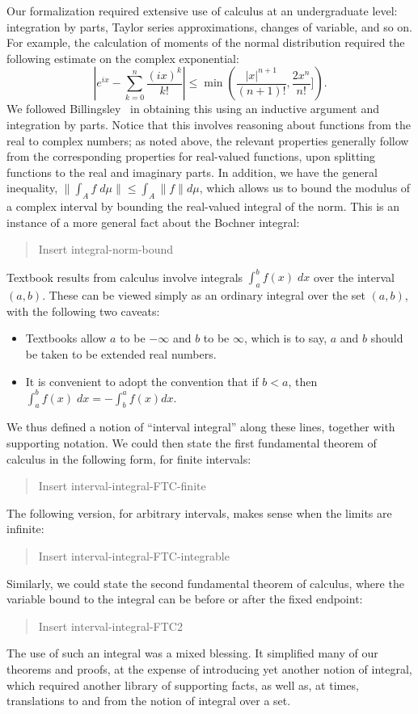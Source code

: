 \documentclass{svjour3}
\newcommand{\todo}[1]{{\color{red}#1}}
\begin{document}
Our formalization required extensive use of calculus at an undergraduate level: integration by parts, Taylor series approximations, changes of variable, and so on. For example, the calculation of moments of the normal distribution required the following estimate on the complex exponential:
\[
 \left| e^{ix} - \sum_{k=0}^n \frac{(ix)^k}{k!} \right| \le \min\left(\frac{|x|^{n+1}}{(n+1)!}, \frac{2 x^n}{n!}]\right).
\]
We followed Billingsley~\cite[Section 26]{billingsley:95} in obtaining this using an inductive argument and integration by parts. Notice that this involves reasoning about functions from the real to complex numbers; as noted above, the relevant properties generally follow from the corresponding properties for real-valued functions, upon splitting functions to the real and imaginary parts. In addition, we have the general inequality, $\| \int_A f \; d\mu \| \le \int_A \| f \| d\mu$, which allows us to bound the modulus of a complex interval by bounding the real-valued integral of the norm. This is an instance of a more general fact about the Bochner integral:
\begin{quote}
\todo{Insert integral-norm-bound}
\end{quote}

Textbook results from calculus involve integrals $\int_a^b f(x) \; dx$ over the interval $(a,b)$. These can be viewed simply as an ordinary integral over the set $(a,b)$, with the following two caveats:
\begin{itemize}
 \item Textbooks allow $a$ to be $-\infty$ and $b$ to be $\infty$, which is to say, $a$ and $b$ should be taken to be extended real numbers.
 \item It is convenient to adopt the convention that if $b < a$, then $\int_a^b f(x) \; dx = -\int_b^a f(x) dx$.
\end{itemize}
We thus defined a notion of ``interval integral'' along these lines, together with supporting notation. We could then state the first fundamental theorem of calculus in the following form, for finite intervals:
\begin{quote}
\todo{Insert interval-integral-FTC-finite}
\end{quote}
The following version, for arbitrary intervals, makes sense when the limits are infinite:
\begin{quote}
\todo{Insert interval-integral-FTC-integrable}
\end{quote}
Similarly, we could state the second fundamental theorem of calculus, where the variable bound to the integral can be before or after the fixed endpoint:
\begin{quote}
\todo{Insert interval-integral-FTC2}
\end{quote}
The use of such an integral was a mixed blessing. It simplified many of our theorems and proofs, at the expense of introducing yet another notion of integral, which required another library of supporting facts, as well as, at times, translations to and from the notion of integral over a set.
\end{document}
